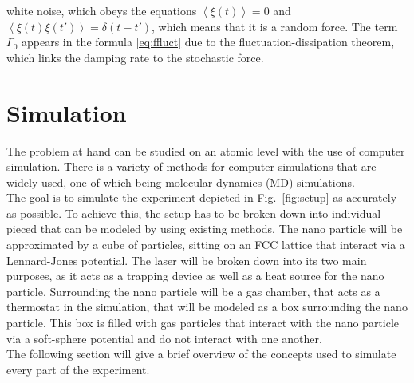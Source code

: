 \documentclass[12pt]{article}
\begin{document}
white noise, which obeys the equations $\left\langle\xi(t)\right\rangle= 0$ and $\left\langle\xi(t)\xi(t')\right\rangle= \delta(t-t')$, which means
that it is a random force. The term $\Gamma_0$ appears in the formula \eqref{eq:ffluct} 
due to the fluctuation-dissipation theorem, which links the damping rate to the stochastic force.\\








\newpage
\section{Simulation}
The problem at hand can be studied on an atomic level with the use of computer simulation. There is a variety of methods for computer simulations
that are widely used, one of which being molecular dynamics (MD) simulations.\\ 
The goal is to simulate the experiment depicted in Fig.~\ref{fig:setup} as accurately as possible. To achieve this, the setup has to be broken down
into individual pieced that can be modeled by using existing methods. The nano particle will be approximated by a cube of particles, sitting on an FCC
lattice that interact via a Lennard-Jones potential. The laser will be broken down into its two main purposes, as it acts as a trapping device as well
as a heat source for the nano particle. Surrounding the nano particle will be a gas chamber, that acts as a thermostat in the simulation, that will be
modeled as a box surrounding the nano particle. This box is filled with gas particles that interact with the nano particle via a soft-sphere potential
and do not interact with one another.\\
The following section will give a brief overview of the concepts used to simulate every part of the experiment.
\end{document}
